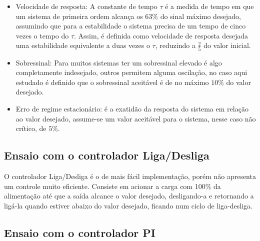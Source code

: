\begin{itemize}

\item Velocidade de resposta: A constante de tempo $\tau$ é a medida
  de tempo em que um sistema de primeira ordem alcança os $63\%$ do
  sinal máximo desejado, assumindo que para a estabilidade o sistema
  precisa de um tempo de cinco vezes o tempo do $\tau$. Assim, é
  definida como velocidade de resposta desejada uma estabilidade
  equivalente a duas vezes o  $\tau$, reduzindo a $\frac{2}{5}$ do valor
  inicial. 

\item Sobressinal: Para muitos sistemas ter um sobressinal elevado é algo completamente indesejado, outros permitem alguma oscilação, no caso aqui estudado é definido que o sobressinal aceitável é de no máximo $10\%$ do valor desejado.
  
\item Erro de regime estacionário: é a exatidão da resposta do sistema em relação ao valor desejado, assume-se um valor aceitável para o sistema, nesse caso não crítico, de $5\%$.
\end{itemize}



\subsection{ Ensaio com o controlador Liga/Desliga }

O controlador Liga/Desliga é o de mais fácil implementação, porém não
apresenta um controle muito eficiente. Consiste em acionar a carga
com 100$\%$ da alimentação até que a saída alcance o valor desejado,
desligando-a e retornando a ligá-la quando estiver abaixo do valor
desejado, ficando num ciclo de liga-desliga. 



\subsection{ Ensaio com o controlador PI }

